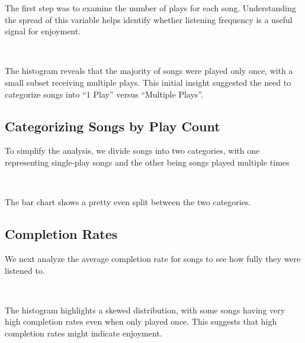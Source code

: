 \documentclass[11pt]{article}
\begin{document}
The first step was to examine the number of plays for each song.
Understanding the spread of this variable helps identify whether
listening frequency is a useful signal for enjoyment.

    \begin{center}
    \end{center}
    { \hspace*{\fill} \\}
    
    The histogram reveals that the majority of songs were played only once,
with a small subset receiving multiple plays. This initial insight
suggested the need to categorize songs into ``1 Play'' versus ``Multiple
Plays''.

\subsection{Categorizing Songs by Play
Count}\label{categorizing-songs-by-play-count}

To simplify the analysis, we divide songs into two categories, with one
representing single-play songs and the other being songs played multiple
times

    \begin{center}
    \end{center}
    { \hspace*{\fill} \\}
    
    The bar chart shows a pretty even split between the two categories.

\subsection{Completion Rates}\label{completion-rates}

We next analyze the average completion rate for songs to see how fully
they were listened to.

    \begin{center}
    \end{center}
    { \hspace*{\fill} \\}
    
    The histogram highlights a skewed distribution, with some songs having
very high completion rates even when only played once. This suggests
that high completion rates might indicate enjoyment.
\end{document}
